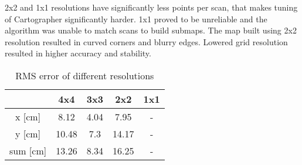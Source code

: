 \documentclass[conference]{IEEEtran}
\begin{document}
2x2 and 1x1 resolutions have significantly less points per scan, that makes tuning of Cartographer significantly 
harder. 1x1 proved to be unreliable and the algorithm was unable to match scans to build submaps. 
The map built using 2x2 resolution resulted in curved corners and blurry edges. Lowered grid resolution 
resulted in higher accuracy and stability.

\begin{table}[!t]
\renewcommand{\arraystretch}{1.3}
\caption{RMS error of different resolutions}
\label{table_resolution}
\centering
\begin{tabular}{|c||c|c|c|c|}
\hline
  & 4x4 & 3x3 & 2x2 & 1x1\\
\hline
\hline
x [cm] & 8.12 & 4.04 & 7.95 & -\\
\hline
y [cm]& 10.48 & 7.3& 14.17& -\\
\hline
sum [cm]& 13.26 & 8.34 & 16.25& -\\
\hline
\end{tabular}
\end{table}







\end{document}
